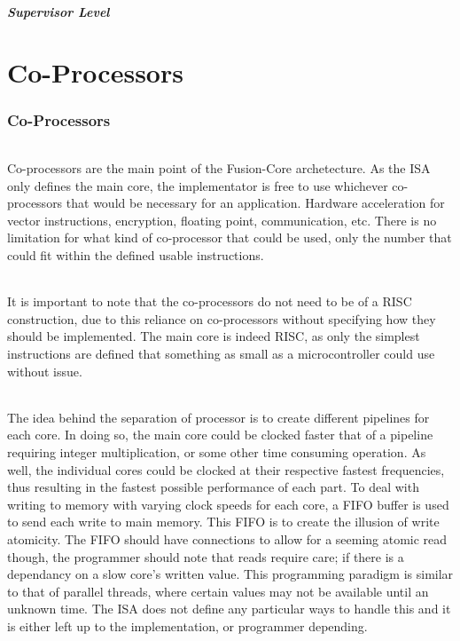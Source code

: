 \documentclass[letterpaper, 11pt]{article}
\begin{document}
\subsubsection{Supervisor Level}

\part{Co-Processors}
\section{Co-Processors}
\paragraph{}Co-processors are the main point of the Fusion-Core archetecture. As the ISA only defines the main core, the implementator is free to use
whichever co-processors that would be necessary for an application. Hardware acceleration for vector instructions, encryption, floating point, communication,
etc. There is no limitation for what kind of co-processor that could be used, only the number that could fit within the defined usable instructions.
\paragraph{}It is important to note that the co-processors do not need to be of a RISC construction, due to this reliance on co-processors without
specifying how they should be implemented. The main core is indeed RISC, as only the simplest instructions are defined that something as small as a microcontroller
could use without issue.
\paragraph{}The idea behind the separation of processor is to create different pipelines for each core. In doing so, the main core could be clocked faster that of
a pipeline requiring integer multiplication, or some other time consuming operation. As well, the individual cores could be clocked at their respective 
fastest frequencies, thus resulting in the fastest possible performance of each part. To deal with writing to memory with varying clock speeds for each core,
a FIFO buffer is used to send each write to main memory. This FIFO is to create the illusion of write atomicity. The FIFO should have connections to allow
for a seeming atomic read though, the programmer should note that reads require care; if there is a dependancy on a slow core's written value. This programming 
paradigm is similar to that of parallel threads, where certain values may not be available until an unknown time. The ISA does not define any particular ways
to handle this and it is either left up to the implementation, or programmer depending.
\end{document}
